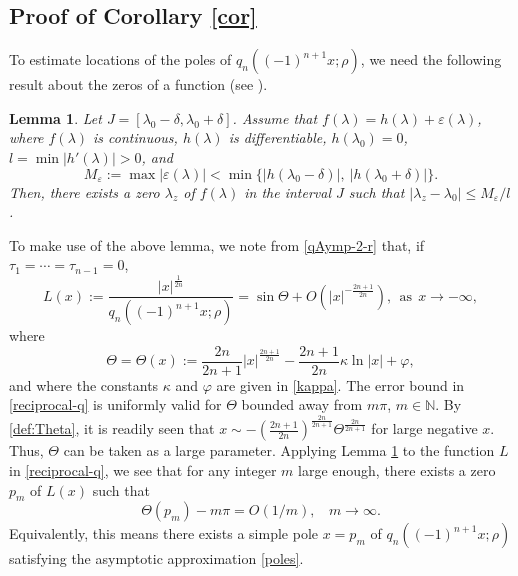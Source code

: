 \documentclass[11pt,a4paper]{article}
\newtheorem{lemma}[thm]{Lemma}
\numberwithin{equation}{section}
\begin{document}
\subsection{Proof of Corollary \ref{cor}}\label{proof:cor}
To estimate locations of the poles of $q_{n}((-1)^{n+1}x;\rho)$, we need the following result about the zeros of a function (see \cite[Theorem 1]{Hethcote}).
\begin{lemma}\label{lem:zeros}
Let $J=[\lambda_0-\delta, \lambda_0+\delta]$. Assume that $f(\lambda)=h(\lambda)+\varepsilon(\lambda)$, where $f(\lambda)$ is continuous, $h(\lambda)$ is differentiable, $h(\lambda_0)=0$, $l=\min |h'(\lambda)| >0$, and
\begin{equation*}
M_\varepsilon:=\max|\varepsilon(\lambda)|<\min\Big\{|h(\lambda_0-\delta)|,
~|h(\lambda_0+\delta)|\Big\}.
\end{equation*}
Then, there exists a zero $\lambda_z$ of $f(\lambda)$  in the interval $J$ such that $|\lambda_z-\lambda_0|\leq M_\varepsilon/l$.
\end{lemma}

To make use of the above lemma, we note from \eqref{qAymp-2-r} that, if $\tau_1=\cdots=\tau_{n-1}=0$,
\begin{equation}\label{reciprocal-q}
L(x):=\frac{|x|^{\frac{1}{2n}}}{q_{n}((-1)^{n+1}x;\rho)} =\sin\Theta +O\left (|x|^{-\frac{2n+1}{2n}}\right ),~~\mathrm{as}~~x\to -\infty,
\end{equation}
where
\begin{equation}\label{def:Theta}
\Theta=\Theta(x):=\frac{2n}{2n+1}|x|^{\frac{2n+1}{2n}}
-\frac{2n+1}{2n}\kappa\ln|x|+\varphi,
\end{equation}
and where the constants $\kappa$ and $\varphi$ are given in \eqref{kappa}. The error bound in \eqref{reciprocal-q} is uniformly valid for $\Theta$ bounded away from $m\pi$, $m\in \mathbb{N}$. By \eqref{def:Theta}, it is readily seen that $x \sim -(\frac{2n+1}{2n})^{\frac{2n}{2n+1}} \Theta^{\frac{2n}{2n+1}}$ for large negative $x$. Thus, $\Theta$ can be taken as a large parameter. Applying Lemma \ref{lem:zeros} to the function $L$ in \eqref{reciprocal-q}, we see that for any integer $m$ large enough, there exists a zero $p_m$ of $L(x)$ such that
\begin{equation*}
\Theta(p_m)-m\pi=O(1/m),~~~~m\to\infty.
\end{equation*}
Equivalently, this means there exists a simple pole $x=p_m$ of $q_{n}((-1)^{n+1}x;\rho)$ satisfying the asymptotic approximation \eqref{poles}.
\end{document}
